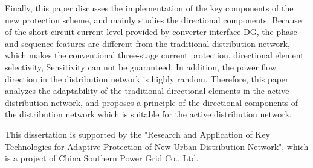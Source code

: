 \begin{englishabstract}
Finally, this paper discusses the implementation of the key components of the new protection scheme, and mainly studies the directional components. Because of the short circuit current level provided by converter interface DG, the phase and sequence features are different from the traditional distribution network, which makes the conventional three-stage current protection, directional element selectivity, Sensitivity can not be guaranteed. In addition, the power flow direction in the distribution network is highly random. Therefore, this paper analyzes the adaptability of the traditional directional elements in the active distribution network, and proposes a principle of the directional components of the distribution network which is suitable for the active distribution network.

This dissertation is supported by the "Research and Application of Key Technologies for Adaptive Protection of New Urban Distribution Network", which is a project of China Southern Power Grid Co., Ltd.

\end{englishabstract}
